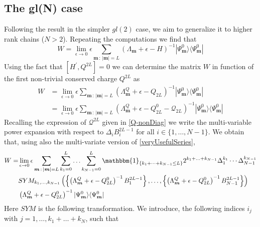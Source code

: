 \documentclass[10pt]{article}
\numberwithin{equation}{section}
\numberwithin{equation}{subsection}
\begin{document}
\subsection{The gl(N) case}
Following the result in the simpler $gl(2)$ case, we aim to generalize it to higher rank chains ($N>2$). Repeating the computations we find that 
\begin{equation}\label{W-extended}
	W= \lim_{\epsilon\to 0}\epsilon\sum_{\bm{m}\,:\,|\bm{m}|=L}  \left(\Lambda_{\bm{m}}+\epsilon-H\right)^{-1}|\Psi_{\bm{m}}^{0}\rangle \langle \Psi_{\bm{m}}^{0}|
\end{equation}
Using the fact that $\left[H^{'},Q^{2L}\right]=0$ we can determine the matrix $W$ in function of the first non-trivial conserved charge $Q^{2L}$ as
\begin{equation}
	\begin{split}
		W&= \lim_{\epsilon\to 0}\epsilon\sum_{\bm{m}\,:\,|\bm{m}|=L}  \left(\Lambda_{\bm{m}}^{Q}+\epsilon-Q_{2L}\right)^{-1}|\Psi_{\bm{m}}^{0}\rangle \langle \Psi_{\bm{m}}^{0}|\\&=\lim_{\epsilon\to 0}\epsilon\sum_{\bm{m}\,:\,|\bm{m}|=L}  \left(\Lambda_{\bm{m}}^{Q}+\epsilon-Q_{2L}^{0}-\mathcal{Q}_{2L}\right)^{-1}|\Psi_{\bm{m}}^{0}\rangle \langle \Psi_{\bm{m}}^{0}|
	\end{split}
\end{equation}
 Recalling the expression of $\mathcal{Q}^{2L}$ given in \eqref{Q-nonDiag} we write the multi-variable power expansion with respect to $\Delta_{i} B_{i}^{2L-1}$ for all $i\in\{1,\ldots,N-1\}$. We obtain that, using also the multi-variate version of \eqref{veryUsefulSeries},
\begin{equation}
	\begin{split}
		W=&\lim_{\epsilon\to 0}\epsilon\sum_{\bm{m}\,:\,|\bm{m}|=L}\sum_{k_{1}=0}^{L}\ldots\sum_{k_{N-1}=0}^{L}\mathbbm{1}_{\{k_{1}+\cdots+k_{N-1}\leq L\}}2^{k_{1}+\ldots+k_{N-1}}\Delta_{1}^{k_{1}}\cdots\Delta_{N-1}^{k_{N-1}}\\&SYM_{k_{1},\ldots,k_{N-1}}\left(\left\{\left(\Lambda_{\bm{m}}^{Q}+\epsilon-Q_{2L}^{0}\right)^{-1}B_{1}^{2L-1}\right\},\ldots,\left\{\left(\Lambda_{\bm{m}}^{Q}+\epsilon-Q_{2L}^{0}\right)^{-1}B_{N-1}^{2L-1}\right\}\right)
		\\&
		\left(\Lambda_{\bm{m}}^{Q}+\epsilon-Q_{2L}^{0}\right)^{-1}|\Psi_{\bm{m}}^{0}\rangle \langle \Psi_{\bm{m}}^{0}|
	\end{split}
\end{equation} 
Here $SYM$ is the following transformation. We introduce, the following indices $i_{j}$ with $j=1,\ldots,k_{1}+\ldots+k_{N}$, such that 
\end{document}
